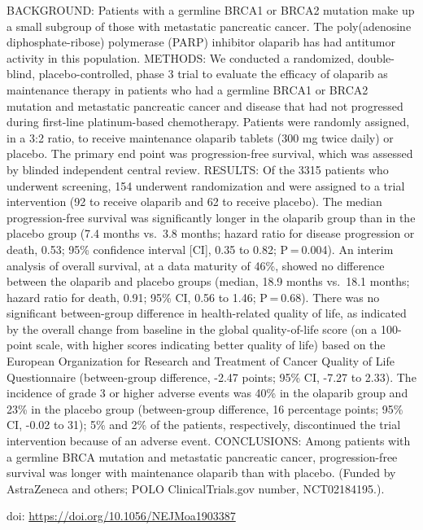 \documentclass[]{article}
\begin{document}
BACKGROUND: Patients with a germline BRCA1 or BRCA2 mutation make up a
small subgroup of those with metastatic pancreatic cancer. The
poly(adenosine diphosphate-ribose) polymerase (PARP) inhibitor olaparib
has had antitumor activity in this population. METHODS: We conducted a
randomized, double-blind, placebo-controlled, phase 3 trial to evaluate
the efficacy of olaparib as maintenance therapy in patients who had a
germline BRCA1 or BRCA2 mutation and metastatic pancreatic cancer and
disease that had not progressed during first-line platinum-based
chemotherapy. Patients were randomly assigned, in a 3:2 ratio, to
receive maintenance olaparib tablets (300 mg twice daily) or placebo.
The primary end point was progression-free survival, which was assessed
by blinded independent central review. RESULTS: Of the 3315 patients who
underwent screening, 154 underwent randomization and were assigned to a
trial intervention (92 to receive olaparib and 62 to receive placebo).
The median progression-free survival was significantly longer in the
olaparib group than in the placebo group (7.4 months vs.~3.8 months;
hazard ratio for disease progression or death, 0.53; 95\% confidence
interval {[}CI{]}, 0.35 to 0.82; P = 0.004). An interim analysis of
overall survival, at a data maturity of 46\%, showed no difference
between the olaparib and placebo groups (median, 18.9 months vs.~18.1
months; hazard ratio for death, 0.91; 95\% CI, 0.56 to 1.46; P = 0.68).
There was no significant between-group difference in health-related
quality of life, as indicated by the overall change from baseline in the
global quality-of-life score (on a 100-point scale, with higher scores
indicating better quality of life) based on the European Organization
for Research and Treatment of Cancer Quality of Life Questionnaire
(between-group difference, -2.47 points; 95\% CI, -7.27 to 2.33). The
incidence of grade 3 or higher adverse events was 40\% in the olaparib
group and 23\% in the placebo group (between-group difference, 16
percentage points; 95\% CI, -0.02 to 31); 5\% and 2\% of the patients,
respectively, discontinued the trial intervention because of an adverse
event. CONCLUSIONS: Among patients with a germline BRCA mutation and
metastatic pancreatic cancer, progression-free survival was longer with
maintenance olaparib than with placebo. (Funded by AstraZeneca and
others; POLO ClinicalTrials.gov number, NCT02184195.).

doi: \url{https://doi.org/10.1056/NEJMoa1903387}

{}

{}
\end{document}
